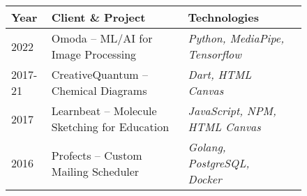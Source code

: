\documentclass[a4paper,12pt]{article}
\begin{document}
\begin{figure}[h]
\centering
\begin{tabular}{llll}
\toprule
{\bfseries Year} & {\bfseries Client \& Project} & {\bfseries Technologies}\\
\midrule
2022 & Omoda -- ML/AI for Image Processing & \emph{Python, MediaPipe, Tensorflow}\\
2017-21 & CreativeQuantum -- Chemical Diagrams & \emph{Dart, HTML Canvas}\\
2017 & Learnbeat -- Molecule Sketching for Education & \emph{JavaScript, NPM, HTML Canvas}\\
2016 & Profects -- Custom Mailing Scheduler & \emph{Golang, PostgreSQL, Docker}\\
\bottomrule
\end{tabular}
\end{figure}

\end{document}
